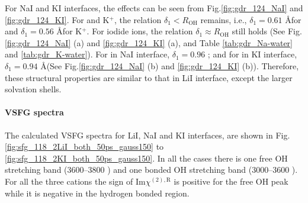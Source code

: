 For NaI and KI interfaces, the effects can be seen from Fig.\thinspace\ref{fig:gdr_124_NaI} and \ref{fig:gdr_124_KI}. For \Na and K$^+$, 
the relation $\delta_1 < R_{\text{OH}}$ remains,
i.e., $\delta_1 = 0.61$ \AA for \Na and $\delta_1 = 0.56$ \AA  for K$^+$.
For iodide ions, the relation $\delta_1 \approx R_{\text{OH}}$ still holds (See Fig.\thinspace\ref{fig:gdr_124_NaI} (a) and \ref{fig:gdr_124_KI} (a),
and Table \ref{tab:gdr_Na-water} and \ref{tab:gdr_K-water}). For \I in NaI interface, $\delta_1 = 0.96$ \A; 
and for \I in KI interface, $\delta_1 = 0.94$ \AA (See Fig.\thinspace\ref{fig:gdr_124_NaI} (b) and \ref{fig:gdr_124_KI} (b)).
Therefore, these structural properties are similar to that in LiI interface, except the larger solvation shells.

\paragraph{VSFG spectra}
The calculated VSFG spectra for LiI, NaI and KI interfaces, are shown in Fig.\thinspace\ref{fig:sfg_118_2LiI_both_50ps_gauss150} to \ref{fig:sfg_118_2KI_both_50ps_gauss150}. 
In all the cases there is one free OH stretching band (3600--3800 \centimeter) and one bonded OH stretching band (3000--3600 \centimeter).
For all the three cations the sign of Im$\chi^{(2),\text{R}}$ is positive for the free OH peak while it is negative in the hydrogen bonded region. %
